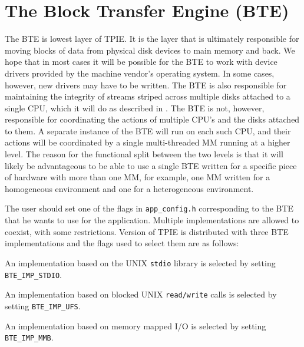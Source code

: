 
\section{The Block Transfer Engine (BTE)}
\label{sec:ref-bte}

The BTE is lowest layer of TPIE.  It is the layer that is ultimately
responsible for moving blocks of data from physical disk devices to main
memory and back.  We hope that in most cases it will be possible for the
BTE to work with device drivers provided by the machine vendor's operating
system.  In some cases, however, new drivers may have to be written.  The
BTE is also responsible for maintaining the integrity of streams striped
across multiple disks attached to a single CPU, which it will do as
described in \cite{vitter:parmem1}.  The BTE is not, however, responsible
for coordinating the actions of multiple CPU's and the disks attached to
them.  A separate instance of the BTE will run on each such CPU, and their
actions will be coordinated by a single multi-threaded MM running at a
higher level.  The reason for the functional split between the two levels
is that it will likely be advantageous to be able to use a single BTE
written for a specific piece of hardware with more than one MM, for
example, one MM written for a homogeneous environment and one for a
heterogeneous environment.

The user should set one of the flags in \verb|app_config.h| corresponding
to the BTE that he wants to use for the application.  Multiple
implementations are allowed to coexist, with some restrictions. Version
\version of TPIE is distributed with three BTE implementations and the
flags used to select them are as follows:

An implementation based on the UNIX {\tt stdio} library  is selected by setting {\tt
  BTE\_IMP\_STDIO}.  
 
An implementation based on blocked UNIX {\tt read/write} calls  is selected by setting {\tt BTE\_IMP\_UFS}.

An implementation based on memory mapped I/O is
selected by setting {\tt BTE\_IMP\_MMB}.  

